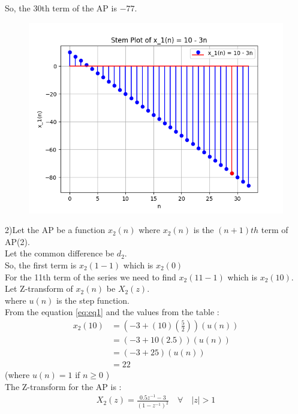 \documentclass[journal,12pt,twocolumn]{IEEEtran}
\theoremstyle{remark}
\begin{document}
So, the 30th term of the AP is $-77$.\\
\begin{figure}[h!]
    \centering
    \includegraphics[width=\columnwidth]{figs/plot1.png}
    \label{fig:1}
\end{figure}

2)Let the AP be a function $x_2(n)$ where $x_2(n)$ is the $(n+1)th$ term of AP(2).\\
Let the common difference be $d_2$.\\
So, the first term is $x_2(1-1)$ which is $x_2(0)$\\ 
For the 11th term of the series we need to find $x_2(11-1)$ which is $x_2(10)$.\\
Let Z-transform of $x_2(n)$ be $X_2(z)$.\\
where \(u(n)\) is the step function.\\
From the equation \eqref{eq:eq1} and the values from the table  :
\begin{align}
x_2(10) &= (-3 + (10)\left(\frac{5}{2}\right))(u(n))\\
&= (-3 + 10(2.5))(u(n))\\
& = (-3 + 25)(u(n)) \\
&= 22
\end{align}
(where $u(n) = 1$ if $n \geq 0$ )\\
The Z-transform for the AP is :
\begin{align}
X_2(z) = \frac{0.5z^{-1}-3}{(1-z^{-1})^2} \quad \forall \quad |z| > 1
\end{align}
\end{document}
